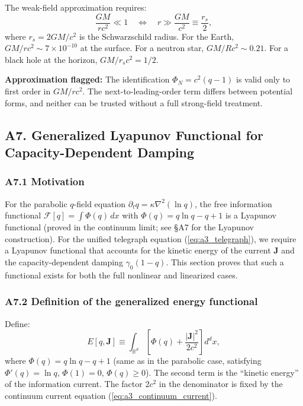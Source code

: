 \documentclass[reprint]{revtex4-2}
\begin{document}
The weak-field approximation requires:
\begin{equation}
\frac{GM}{rc^2} \ll 1 \quad\Longleftrightarrow\quad r \gg \frac{GM}{c^2} \equiv \frac{r_s}{2},
\end{equation}
where $r_s = 2GM/c^2$ is the Schwarzschild radius. For the Earth, $GM/rc^2 \sim 7\times 10^{-10}$ at the surface. For a neutron star, $GM/Rc^2 \sim 0.21$. For a black hole at the horizon, $GM/r_s c^2 = 1/2$.

\textbf{Approximation flagged:} The identification $\Phi_N = c^2(q-1)$ is valid only to first order in $GM/rc^2$. The next-to-leading-order term differs between potential forms, and neither can be trusted without a full strong-field treatment.

\subsection{A7. Generalized Lyapunov Functional for Capacity-Dependent Damping}

\subsubsection{A7.1 Motivation}

For the parabolic $q$-field equation $\partial_t q = \kappa\nabla^2(\ln q)$, the free information functional $\mathcal{F}[q] = \int \Phi(q)\,dx$ with $\Phi(q)=q\ln q - q + 1$ is a Lyapunov functional (proved in the continuum limit; see \S A7 for the Lyapunov construction). For the unified telegraph equation (\ref{eq:a3_telegraph}), we require a Lyapunov functional that accounts for the kinetic energy of the current $\mathbf{J}$ and the capacity-dependent damping $\gamma_0(1-q)$. This section proves that such a functional exists for both the full nonlinear and linearized cases.

\subsubsection{A7.2 Definition of the generalized energy functional}

Define:
\begin{equation}
E[q,\mathbf{J}] \equiv \int_{\mathbb{R}^d} \left[\Phi(q) + \frac{|\mathbf{J}|^2}{2c^2}\right] d^d x,
\label{eq:energy_def}
\end{equation}
where $\Phi(q) = q\ln q - q + 1$ (same as in the parabolic case, satisfying $\Phi'(q)=\ln q$, $\Phi(1)=0$, $\Phi(q)\ge 0$). The second term is the ``kinetic energy'' of the information current. The factor $2c^2$ in the denominator is fixed by the continuum current equation (\ref{eq:a3_continuum_current}).
\end{document}
